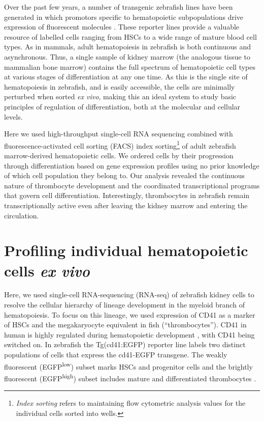 Over the past few years, a number of transgenic zebrafish lines have been generated in which promotors specific to hematopoietic subpopulations drive expression of fluorescent molecules \cite{Carradice2008-lz}. These reporter lines provide a valuable resource of labelled cells ranging from HSCs to a wide range of mature blood cell types. As in mammals, adult hematopoiesis in zebrafish is both continuous and asynchronous. Thus, a single sample of kidney marrow (the analogous tissue to mammalian bone marrow) contains the full spectrum of hematopoietic cell types at various stages of differentiation at any one time. As this is the single site of hematopoiesis in zebrafish, and is easily accessible, the cells are minimally perturbed when sorted \textit{ex vivo}, making this an ideal system to study basic principles of regulation of differentiation, both at the molecular and cellular levels.

Here we used high-throughput single-cell RNA sequencing combined with fluorescence-activated cell sorting (FACS) index sorting\footnote{\textit{Index sorting} refers to maintaining flow cytometric analysis values for the individual cells sorted into wells.} of adult zebrafish marrow-derived hematopoietic cells. We ordered cells by their progression through differentiation based on gene expression profiles using no prior knowledge of which cell population they belong to. Our analysis revealed the continuous nature of thrombocyte development and the coordinated transcriptional programs that govern cell differentiation. Interestingly, thrombocytes in zebrafish remain transcriptionally active even after leaving the kidney marrow and entering the circulation.

\section{Profiling individual hematopoietic cells \textit{ex vivo}}

Here, we used single-cell RNA-sequencing (RNA-seq) of zebrafish kidney cells to resolve the cellular hierarchy of lineage development in the myeloid branch of hematopoiesis. To focus on this lineage, we used expression of CD41 as a marker of HSCs and the megakaryocyte equivalent in fish (``thrombocytes''). CD41 in human is highly regulated during hematopoietic development  \cite{Debili2001-ib, Robin2011-en}, with CD41 being switched on. In zebrafish the Tg(cd41:EGFP) reporter line labels two distinct populations of cells that express the cd41-EGFP transgene. The weakly fluorescent (EGFP\textsuperscript{low}) subset marks HSCs and progenitor cells \cite{Ma2011-hg} and the brightly fluorescent (EGFP\textsuperscript{high}) subset includes mature and differentiated thrombocytes \cite{Ma2011-hg}.

